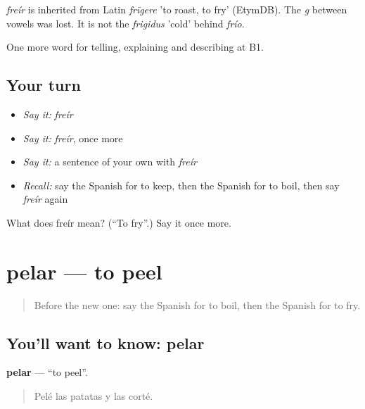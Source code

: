 \begin{cousinweb}
\emph{freír} is inherited from Latin \emph{frīgere} 'to roast, to fry' (EtymDB). The \emph{g} between vowels was lost. It is not the \emph{frigidus} 'cold' behind \emph{frío}.
\end{cousinweb}

\begin{grammarlens}[title={What you've built}]
One more word for telling, explaining and describing at B1.
\end{grammarlens}

\subsection*{Your turn}
\begin{itemize}
\raggedright
  \item \emph{Say it:} \emph{freír}
  \item \emph{Say it:} \emph{freír}, once more
  \item \emph{Say it:} a sentence of your own with \emph{freír}
  \item \emph{Recall:} say the Spanish for to keep, then the Spanish for to boil, then say \emph{freír} again
\end{itemize}

\begin{tcolorbox}[breakable,colback=teal!4,colframe=teal!35!black,title={Before you move on}]
What does freír mean? (\textquotedblleft{}To fry\textquotedblright{}.) Say it once more.
\end{tcolorbox}
\section[pelar]{pelar — to peel}

\label{lesson:ES-C768-pelar}



\begin{quote}
Before the new one: say the Spanish for to boil, then the Spanish for to fry.
\end{quote}

\subsection*{You'll want to know: pelar}
\textbf{pelar} — \textquotedblleft{}to peel\textquotedblright{}.

\begin{quote}
Pelé las patatas y las corté.
\end{quote}

